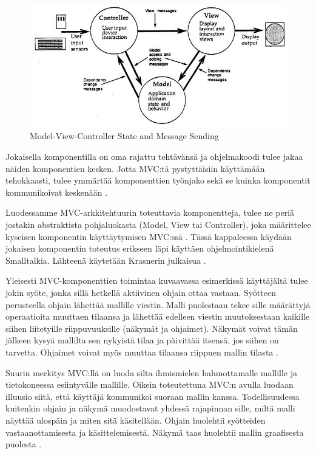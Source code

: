 \documentclass[utf8]{gradu3}
\begin{document}
\begin{figure}[h]
\centering
\includegraphics[scale=0.85]{krasner_mvc.jpg}
\caption{Model-View-Controller State and Message Sending \parencite[s. 5]{krasner_desc}}
\end{figure} 
Jokaisella komponentilla on oma rajattu tehtävänsä ja ohjelmakoodi tulee jakaa näiden komponentien kesken. Jotta MVC:tä pystyttäisiin käyttämään
tehokkaasti, tulee ymmärtää komponenttien työnjako sekä se kuinka komponentit kommunikoivat keskenään \parencite{burbeck}. 

Luodessamme MVC-arkkitehtuurin toteuttavia komponentteja, tulee ne periä jostakin abstraktista pohjaluokasta (Model, View tai Controller), joka määrittelee kyseisen komponentin käyttäytymisen MVC:ssä  \parencite[s. 5]{krasner_desc}.  Tässä kappaleessa käydään jokaisen komponentin toteutus erikseen läpi käyttäen ohjelmointikielenä Smalltalkia. Lähteenä käytetään Krasnerin julkaisua \parencite{krasner_desc}.

Yleisesti MVC-komponenttien toimintaa kuvaavassa esimerkissä käyttäjältä tulee jokin syöte, jonka sillä hetkellä aktiivinen ohjain ottaa vastaan. Syötteen perusteella ohjain lähettää mallille viestin. Malli puolestaan tekee sille määrättyjä operaatioita muuttaen tilaansa ja lähettää edelleen viestin muutoksestaan kaikille siihen liitetyille riippuvuuksille (näkymät ja ohjaimet). Näkymät
voivat tämän jälkeen kysyä mallilta sen nykyistä tilaa ja päivittää itsensä, jos siihen on tarvetta. Ohjaimet voivat myös muuttaa tilaansa riippuen mallin tilasta \parencite[s. 4]{krasner_desc}. 

Suurin merkitys MVC:llä on luoda silta ihmismielen hahmottamalle mallille ja tietokoneessa esiintyvälle mallille. Oikein toteutettuna MVC:n avulla luodaan illuusio siitä, että käyttäjä kommunikoi suoraan mallin kanssa. Todellisuudessa kuitenkin ohjain ja näkymä muodostavat yhdessä rajapinnan sille, miltä malli näyttää ulospäin ja miten sitä käsitellään. Ohjain huolehtii syötteiden vastaanottamisesta ja käsittelemisestä. Näkymä taas huolehtii mallin graafisesta puolesta \parencite[s. 11-12]{reenskaug_tools}. 
\end{document}
